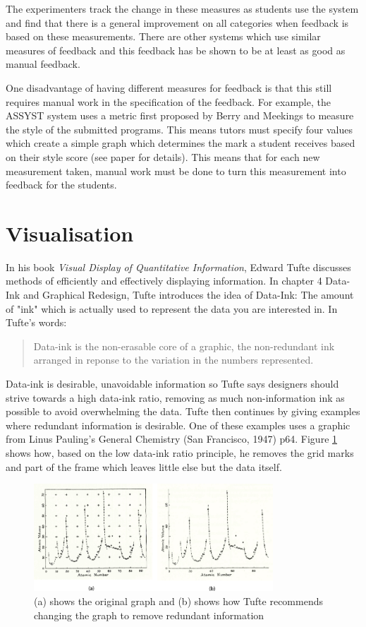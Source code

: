 The experimenters track the change in these measures as students use the system and find that there is a general improvement on all categories when feedback is based on these measurements. There are other systems which use similar measures of feedback\cite{ASSYST} and this feedback has be shown to be at least as good as manual feedback\cite{coursemaster}.

One disadvantage of having different measures for feedback is that this still requires manual work in the specification of the feedback. For example, the ASSYST system\cite{ASSYST} uses a metric first proposed by Berry and Meekings\cite{berrymeekings} to measure the style of the submitted programs. This means tutors must specify four values which create a simple graph which determines the mark a student receives based on their style score (see paper for details). This means that for each new measurement taken, manual work must be done to turn this measurement into feedback for the students.

\section{Visualisation}
In his book {\it Visual Display of Quantitative Information}\cite{visual_explanations}, Edward Tufte discusses methods of efficiently and effectively displaying information. In chapter 4 Data-Ink and Graphical Redesign, Tufte introduces the idea of Data-Ink: The amount of "ink" which is actually used to represent the data you are interested in. In Tufte's words:

\begin{quote}Data-ink is the non-erasable core of a graphic, the non-redundant ink arranged in reponse to the variation in the numbers represented.
\end{quote}
Data-ink is desirable, unavoidable information so Tufte says designers should strive towards a high data-ink ratio, removing as much non-information ink as possible to avoid overwhelming the data. Tufte then continues by giving examples where redundant information is desirable. One of these examples uses a graphic from Linus Pauling's General Chemistry (San Francisco, 1947) p64. Figure \ref{fig:tuftegraphs} shows how, based on the low data-ink ratio principle, he removes the grid marks and part of the frame which leaves little else but the data itself.

\begin{figure}[h!]
\centering
\includegraphics[width=0.8\textwidth]{images/tuftegraphs.png}
\caption{(a) shows the original graph and (b) shows how Tufte recommends changing the graph to remove redundant information}
\label{fig:tuftegraphs}
\end{figure}


